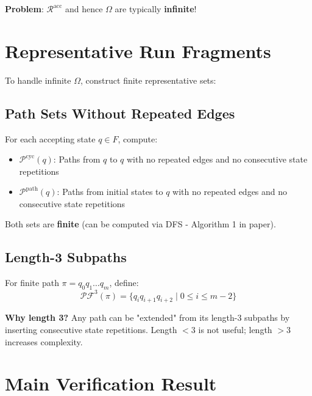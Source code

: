 \documentclass{article}
\begin{document}
\textbf{Problem}: $\mathcal{R}^{\text{acc}}$ and hence $\Omega$ are typically \textbf{infinite}!

\section{Representative Run Fragments}

To handle infinite $\Omega$, construct finite representative sets:

\subsection{Path Sets Without Repeated Edges}

For each accepting state $q \in F$, compute:
\begin{itemize}
    \item $\mathcal{P}^{\text{cyc}}(q)$: Paths from $q$ to $q$ with no repeated edges and no consecutive state repetitions
    \item $\mathcal{P}^{\text{path}}(q)$: Paths from initial states to $q$ with no repeated edges and no consecutive state repetitions
\end{itemize}

Both sets are \textbf{finite} (can be computed via DFS - Algorithm 1 in paper).

\subsection{Length-3 Subpaths}

For finite path $\pi = q_0 q_1 \ldots q_m$, define:
\begin{equation}
\mathcal{PF}^3(\pi) = \{q_i q_{i+1} q_{i+2} \mid 0 \leq i \leq m-2\}
\end{equation}

\textbf{Why length 3?} Any path can be "extended" from its length-3 subpaths by inserting consecutive state repetitions. Length $< 3$ is not useful; length $> 3$ increases complexity.

\section{Main Verification Result}
\end{document}
